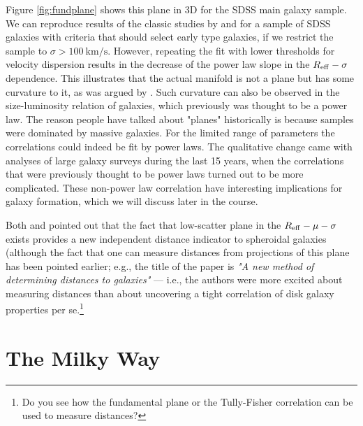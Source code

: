 Figure \ref{fig:fundplane} shows this plane in 3D for the SDSS main galaxy sample.  We can reproduce results of the classic  studies by \href{http://adsabs.harvard.edu/abs/1987ApJ...313...42D}{\citet{dressler_etal87}} and \href{http://adsabs.harvard.edu/abs/1987ApJ...313...59D}{\citet{djorgovski_davis87}} for a sample
of SDSS galaxies with criteria that should select early type galaxies, if we restrict the sample to $\sigma>100\ \mathrm{km/s}$. 
However, repeating the fit with lower thresholds for velocity dispersion results in the decrease of the power law slope in the $R_{\rm eff}-\sigma$ dependence. This illustrates that the actual manifold is not a plane but has some curvature to it, as was argued by \href{http://adsabs.harvard.edu/abs/2009MNRAS.394.1978H}{\citet{hyde_bernardi09}}. Such curvature can also be observed in the size-luminosity relation of galaxies, which previously was thought to be a power law. The reason people have talked about "planes" historically is because samples were dominated by massive galaxies. For the limited range of parameters the correlations could indeed be fit by power laws. The qualitative change came with analyses of large galaxy surveys during the last 15 years, when the correlations that were previously thought to be power laws turned out to be more complicated. These non-power law correlation have interesting implications for galaxy formation, which we will discuss later in the course. 

Both \href{http://adsabs.harvard.edu/abs/1987ApJ...313...42D}{\citet{dressler_etal87}} and \href{http://adsabs.harvard.edu/abs/1987ApJ...313...59D}{\citet{djorgovski_davis87}}  pointed out that the fact that low-scatter plane in the $R_{\rm eff}-\mu-\sigma$ exists provides a new independent distance indicator to spheroidal galaxies (although the fact that one can measure distances from projections of this plane has been pointed earlier; e.g., the title of the \href{http://adsabs.harvard.edu/abs/1977A&A....54..661T}{\citet{tully_fisher77}} paper is {\it "A new method of determining distances to galaxies"} --- i.e., the authors were more excited about measuring distances than about uncovering a tight correlation of disk galaxy properties per se.\footnote{Do you see how the fundamental plane or the Tully-Fisher correlation can be used to measure distances?}

\section{The Milky Way}
\label{sec:mwoverview}

